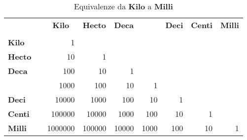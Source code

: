 \begin{table}
	\centering
	\begin{tabular}{llrrrrrrr}
		\toprule	
			&&\multicolumn{1}{c}{\textbf{Kilo}} &\multicolumn{1}{c}{\textbf{Hecto}} & \multicolumn{1}{c}{\textbf{Deca}} &  & \multicolumn{1}{c}{\textbf{Deci}} & \multicolumn{1}{c}{\textbf{Centi}} & \multicolumn{1}{c}{\textbf{Milli}} \\ 
			&&\multicolumn{1}{c}{\textbf{\si{\kilo}}} & \multicolumn{1}{c}{\textbf{\si{\hecto}}} & \multicolumn{1}{c}{\textbf{\si{\deca}}} &  & \multicolumn{1}{c}{\textbf{\si{\deci}}} & \multicolumn{1}{c}{\textbf{\si{\centi}}} & \multicolumn{1}{c}{\textbf{\si{\milli}}} \\ 
			\midrule
		\textbf{Kilo}&\si{\kilo}	&\num{1}  &  &  &  &  &  &  \\ 
		\textbf{Hecto}&\si{\hecto}	& \num{10} &\num{1}  &  &  &  &  &  \\ 
		\textbf{Deca}&\si{\deca}	& \num{100} & \num{10} &\num{1}  &  &  &  &  \\ 
	&	& \num{1000} & \num{100} &\num{10}  &\num{1}  &  &  &  \\ 
		\textbf{Deci}&\si{\deci}	& \num{10000} &\num{1000}  &\num{100}  &\num{10}  & \num{1} &  &  \\ 
		\textbf{Centi}&\si{\centi}	&\num{100000}  & \num{10000} & \num{1000} & \num{100} &\num{10}  & \num{1} &  \\ 
		\textbf{Milli}&\si{\milli}	&\num{1000000}  &\num{100000}  & \num{10000} &\num{1000}  & \num{100} & \num{10} & \num{1} \\ 
		\bottomrule
	\end{tabular} 
	\caption{Equivalenze da \textbf{Kilo} a \textbf{Milli}}
\end{table}
